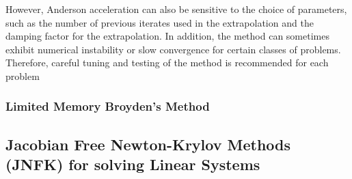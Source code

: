 However, Anderson acceleration can also be sensitive to the choice of parameters, such as the number of previous iterates used in the extrapolation and the damping factor for the extrapolation. In addition, the method can sometimes exhibit numerical instability or slow convergence for certain classes of problems. Therefore, careful tuning and testing of the method is recommended for each problem

\subsubsection{Limited Memory Broyden's Method}
\label{subsec:limited_memory_broyden}


\subsection{Jacobian Free Newton-Krylov Methods (JNFK) for solving Linear Systems}
\label{subsec:newton_krylov_methods}




